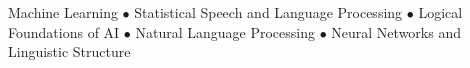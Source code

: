 Machine Learning $\bullet$ Statistical Speech and Language Processing $\bullet$ Logical Foundations of AI $\bullet$ Natural Language Processing $\bullet$ Neural Networks and Linguistic Structure


